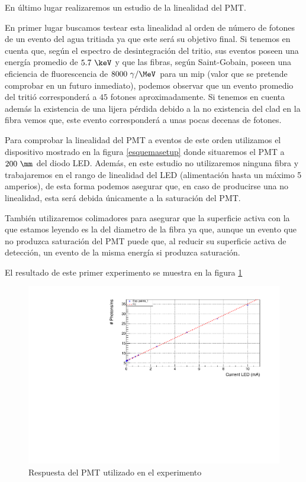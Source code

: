 En último lugar realizaremos un estudio de la linealidad del PMT. 

En primer lugar buscamos testear esta linealidad al orden de número de fotones de un evento del agua tritiada ya que este será su objetivo final. Si tenemos en cuenta que, según el espectro de desintegración del tritio, sus eventos poseen una energía promedio de $5.7~\keV$ y que las fibras, según Saint-Gobain, poseen una eficiencia de fluorescencia de $8000~\gamma/\MeV$ para un mip (valor que se pretende comprobar en un futuro inmediato), podemos observar que un evento promedio del tritió corresponderá a $45$ fotones aproximadamente. Si tenemos en cuenta además la existencia de una lijera pérdida debido a la no existencia del clad en la fibra vemos que, este evento corresponderá a unas pocas decenas de fotones.

Para comprobar la linealidad del PMT a eventos de este orden utilizamos el dispositivo mostrado en la figura \ref{esquemasetup} donde situaremos el PMT a $200~\mm$ del diodo LED. Además, en este estudio no utilizaremos ninguna fibra y trabajaremos en el rango de linealidad del LED (alimentación hasta un máximo 5 amperios), de esta forma podemos asegurar que, en caso de producirse una no linealidad, esta será debida únicamente a la saturación del PMT. 

También utilizaremos colimadores para asegurar que la superficie activa con la que estamos leyendo es la del diametro de la fibra ya que, aunque un evento que no produzca saturación del PMT puede que, al reducir su superficie activa de detección, un evento de la misma energía si produzca saturación.

El resultado de este primer experimento se muestra en la figura \ref{linealidadordentritio}

\begin{figure}[H]
\centering
\includegraphics[scale=0.7]{Figuras/fit1background.pdf}
\caption{Respuesta del PMT utilizado en el experimento\label{linealidadordentritio}}
\end{figure}

